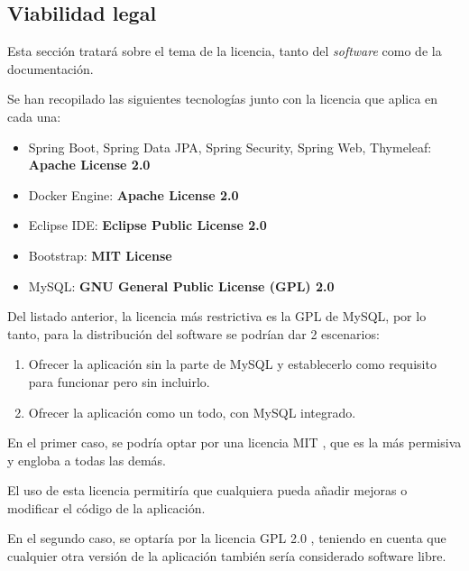 \clearpage
\subsection{Viabilidad legal}

Esta sección tratará sobre el tema de la licencia, tanto del \textit{software} como de la documentación.

Se han recopilado las siguientes tecnologías junto con la licencia que aplica en cada una:

\begin{itemize}
	\item Spring Boot, Spring Data JPA, Spring Security, Spring Web, Thymeleaf: \textbf{Apache License 2.0}
	\item Docker Engine: \textbf{Apache License 2.0}
	\item Eclipse IDE:  \textbf{Eclipse Public License 2.0}
	\item Bootstrap:  \textbf{MIT License}
	\item MySQL:  \textbf{GNU General Public License (GPL) 2.0}
\end{itemize}

Del listado anterior, la licencia más restrictiva es la GPL de MySQL, por lo tanto, para la distribución del software se podrían dar 2 escenarios:

\begin{enumerate}
	\item Ofrecer la aplicación sin la parte de MySQL y establecerlo como requisito para funcionar pero sin incluirlo.
	\item Ofrecer la aplicación como un todo, con MySQL integrado.
\end{enumerate}


En el primer caso, se podría optar por una licencia MIT \cite{licencia:mit}, que es la más permisiva y engloba a todas las demás.

El uso de esta licencia permitiría que cualquiera pueda añadir mejoras o modificar el código de la aplicación.

En el segundo caso, se optaría por la licencia GPL 2.0 \cite{licencia:gpl}, teniendo en cuenta que cualquier otra versión de la aplicación también sería considerado software libre.

